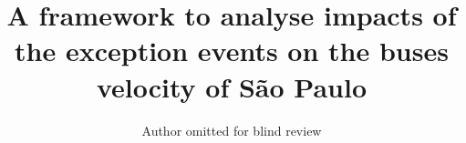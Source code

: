 \documentclass[runningheads]{llncs}
\begin{document}
%
\title{A framework to analyse impacts of the exception events on the buses velocity of São Paulo}
%
%

%
%
%

\author{Author omitted for blind review} %
\end{document}
